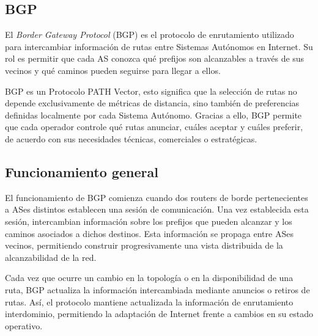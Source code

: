 \subsection{BGP} \label{sec:anexo_bgp}

El \textit{Border Gateway Protocol} (BGP) es el protocolo de enrutamiento utilizado para 
intercambiar información de rutas entre Sistemas Autónomos en Internet. Su rol es permitir 
que cada AS conozca qué prefijos son alcanzables a través de sus vecinos y qué caminos pueden 
seguirse para llegar a ellos.

BGP es un Protocolo PATH Vector, esto significa que la selección de rutas no depende exclusivamente 
de métricas de distancia, sino también de preferencias definidas localmente por cada Sistema 
Autónomo. Gracias a ello, BGP permite que cada operador controle qué rutas anunciar, cuáles aceptar y cuáles preferir, de acuerdo con sus necesidades técnicas, comerciales o estratégicas.




\subsection{Funcionamiento general}

El funcionamiento de BGP comienza cuando dos routers de borde pertenecientes a ASes distintos establecen 
una sesión de comunicación. Una vez establecida esta sesión, intercambian información sobre los prefijos 
que pueden alcanzar y los caminos asociados a dichos destinos. Esta información se propaga entre ASes 
vecinos, permitiendo construir progresivamente una vista distribuida de la alcanzabilidad de la red.

Cada vez que ocurre un cambio en la topología o en la disponibilidad de una ruta, BGP actualiza la 
información intercambiada mediante anuncios o retiros de rutas. Así, el protocolo mantiene actualizada 
la información de enrutamiento interdominio, permitiendo la adaptación de Internet frente a cambios 
en su estado operativo.







